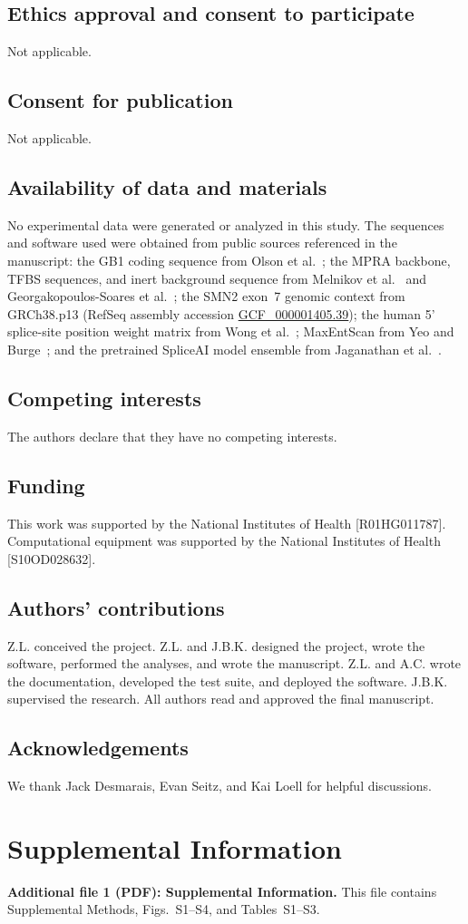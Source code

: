 \subsection*{Ethics approval and consent to participate}
Not applicable.

\subsection*{Consent for publication}
Not applicable.

\subsection*{Availability of data and materials}
No experimental data were generated or analyzed in this study. The sequences and software used were obtained from public sources referenced in the manuscript: the GB1 coding sequence from Olson et al.~\citep{Olson2014iq}; the MPRA backbone, TFBS sequences, and inert background sequence from Melnikov et al.~\citep{Melnikov2012dw} and Georgakopoulos-Soares et al.~\citep{GeorgakopoulosSoares2023tf}; the SMN2 exon~7 genomic context from GRCh38.p13 (RefSeq assembly accession \href{https://www.ncbi.nlm.nih.gov/datasets/genome/GCF_000001405.39/}{GCF\_000001405.39}); the human 5' splice-site position weight matrix from Wong et al.~\citep{Wong2018quantitative}; MaxEntScan from Yeo and Burge~\citep{Yeo2004me}; and the pretrained SpliceAI model ensemble from Jaganathan et al.~\citep{Jaganathan2019ps}.

\subsection*{Competing interests}
The authors declare that they have no competing interests.

\subsection*{Funding}
This work was supported by the National Institutes of Health [R01HG011787]. Computational equipment was supported by the National Institutes of Health [S10OD028632].

\subsection*{Authors' contributions}
Z.L. conceived the project. Z.L. and J.B.K. designed the project, wrote the software, performed the analyses, and wrote the manuscript. Z.L. and A.C. wrote the documentation, developed the test suite, and deployed the software. J.B.K. supervised the research. All authors read and approved the final manuscript.

\subsection*{Acknowledgements}
We thank Jack Desmarais, Evan Seitz, and Kai Loell for helpful discussions.

\section*{Supplemental Information}

\textbf{Additional file 1 (PDF): Supplemental Information.}
This file contains Supplemental Methods, Figs.~S1--S4, and Tables~S1--S3.
